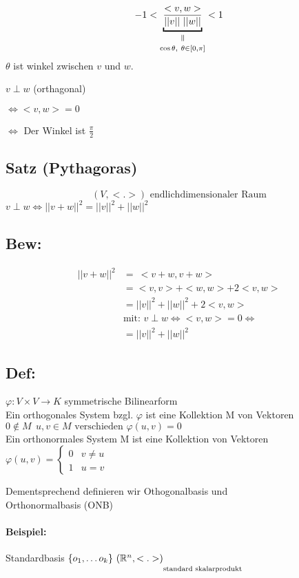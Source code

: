 \documentclass[titlepage,12pt,a4paper,ngerman]{report}
\newcommand{\verteq}{\rotatebox{90}{$\,=$}}
\newcommand{\equalto}[2]{\underset{\scriptstyle\overset{\mkern4mu\verteq}{#2}}{#1}}
\newcommand{\tx}[1]{\textrm{#1}}
\newcommand{\casess}[4]{\left\{ \begin{array}{ll} {#1} & {#2} \\ {#3} & {#4} \end{array} \right.}
\begin{document}
$$-1 < \equalto{\underbracket{\frac{<v,w>}{||v||\ ||w||}}}{ \cos \theta ,\ \theta \in [0, \pi]}<1$$
$\theta$ ist winkel zwischen $v$ und $w$.
\begin{trivlist}
	\item $v \perp w$ (orthagonal) 
	\item $\Leftrightarrow <v,w> = 0$
	\item $\Leftrightarrow$ Der Winkel ist $\frac{\pi}{2}$
\end{trivlist}

\subsection{Satz (Pythagoras)}
$$(V, <.>) \tx{ endlichdimensionaler Raum}$$
$v \perp w \Leftrightarrow ||v + w||^2 = ||v||^2 + ||w||^2$

\subsection{Bew:}
\begin{align*}
||v+w||^2 &=\  <v+w,v+w> \ \\ 
&= <v,v>+<w,w> + 2<v,w>\\
&= ||v||^2 + ||w||^2 + 2 <v,w> \\
&\tx{mit: } v\perp w \Leftrightarrow <v,w> = 0 \Leftrightarrow \\
&= ||v||^2 + ||w||^2
\end{align*}
\subsection{Def:}
$ \varphi:V\times V \to K $ symmetrische Bilinearform\\
Ein orthogonales System bzgl. $ \varphi $ ist eine Kollektion M von Vektoren $ 0 \notin M \ \ u,v \in M \tx{ verschieden } \varphi(u,v) = 0 $\\
Ein orthonormales System M ist eine Kollektion von Vektoren\\ $ \varphi(u,v) = \casess{0}{v\neq u}{1}{u=v} $

Dementsprechend definieren wir Othogonalbasis und \\ 
Orthonormalbasis (ONB)
\paragraph{Beispiel:}
Standardbasis $\{o_1, \dots o_k \}\ (\mathbb R^n, \underset{\scriptstyle}{<.>)}_{\tx{standard skalarprodukt}}$
\end{document}
